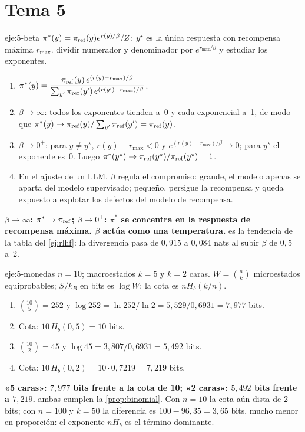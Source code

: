 \section{Tema 5}

\begin{solucion}{eje:5-beta}
\datos $\pi^{*}(y)=\pi_{\mathrm{ref}}(y)e^{r(y)/\beta}/Z$; $y^{\star}$ es la única respuesta con recompensa máxima $r_{\max}$.
\planteamiento dividir numerador y denominador por $e^{r_{\max}/\beta}$ y estudiar los exponentes.
\pasos
\begin{enumerate}[label=\arabic*.]
  \item $\pi^{*}(y)=\dfrac{\pi_{\mathrm{ref}}(y)\,e^{(r(y)-r_{\max})/\beta}}{\sum_{y'}\pi_{\mathrm{ref}}(y')\,e^{(r(y')-r_{\max})/\beta}}$.
  \item $\beta\to\infty$: todos los exponentes tienden a~0 y cada exponencial a~1, de modo que $\pi^{*}(y)\to\pi_{\mathrm{ref}}(y)/\sum_{y'}\pi_{\mathrm{ref}}(y')=\pi_{\mathrm{ref}}(y)$.
  \item $\beta\to 0^{+}$: para $y\ne y^{\star}$, $r(y)-r_{\max}<0$ y $e^{(r(y)-r_{\max})/\beta}\to 0$; para $y^{\star}$ el exponente es~0. Luego $\pi^{*}(y^{\star})\to\pi_{\mathrm{ref}}(y^{\star})/\pi_{\mathrm{ref}}(y^{\star})=1$.
  \item En el ajuste de un LLM, $\beta$ regula el compromiso: grande, el modelo apenas se aparta del modelo supervisado; pequeño, persigue la recompensa y queda expuesto a explotar los defectos del modelo de recompensa.
\end{enumerate}
\resultado \textbf{$\beta\to\infty$: $\pi^{*}\to\pi_{\mathrm{ref}}$; $\beta\to 0^{+}$: $\pi^{*}$ se concentra en la respuesta de recompensa máxima. $\beta$ actúa como una temperatura.}
\comprobacion es la tendencia de la tabla del \cref{ej:rlhf}: la divergencia pasa de $0{,}915$ a $0{,}084$ nats al subir $\beta$ de $0{,}5$ a~2.
\end{solucion}

\begin{solucion}{eje:5-monedas}
\datos $n=10$; macroestados $k=5$ y $k=2$ caras.
\planteamiento $W=\binom{n}{k}$ microestados equiprobables; $S/k_B$ en bits es $\log W$; la cota es $nH_b(k/n)$.
\pasos
\begin{enumerate}[label=\arabic*.]
  \item $\binom{10}{5}=252$ y $\log 252=\ln 252/\ln 2=5{,}529/0{,}6931=7{,}977$ bits.
  \item Cota: $10\,H_b(0{,}5)=10$ bits.
  \item $\binom{10}{2}=45$ y $\log 45=3{,}807/0{,}6931=5{,}492$ bits.
  \item Cota: $10\,H_b(0{,}2)=10\cdot 0{,}7219=7{,}219$ bits.
\end{enumerate}
\resultado \textbf{«5 caras»: $7{,}977$ bits frente a la cota de 10; «2 caras»: $5{,}492$ bits frente a $7{,}219$.}
\comprobacion ambas cumplen la \cref{prop:binomial}. Con $n=10$ la cota aún dista de 2 bits; con $n=100$ y $k=50$ la diferencia es $100-96{,}35=3{,}65$ bits, mucho menor en proporción: el exponente $nH_b$ es el término dominante.
\end{solucion}

